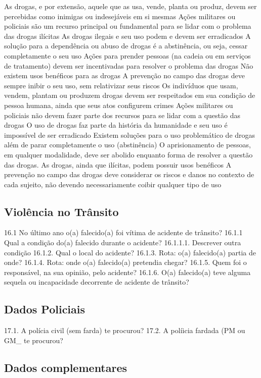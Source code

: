 As drogas, e por extensão, aquele que as usa, vende, planta ou produz, devem ser percebidas como inimigas ou indesejáveis em si mesmas
Ações militares ou policiais são um recurso principal ou fundamental para se lidar com o problema das drogas ilícitas
As drogas ilegais e seu uso podem e devem ser erradicados
A solução para a dependência ou abuso de drogas é a abstinência, ou seja, cessar completamente o seu uso
Ações para prender pessoas (na cadeia ou em serviços de tratamento) devem ser incentivadas para resolver o problema das drogas
Não existem usos benéficos para as drogas
A prevenção no campo das drogas deve sempre inibir o seu uso, sem relativizar seus riscos
Os indivíduos que usam, vendem, plantam ou produzem drogas devem ser respeitados em sua condição de pessoa humana, ainda que seus atos configurem crimes
Ações militares ou policiais não devem fazer parte dos recursos para se lidar com a questão das drogas
O uso de drogas faz parte da história da humanidade e seu uso é impossível de ser erradicado
Existem soluções para o uso problemático de drogas além de parar completamente o uso (abstinência)
O aprisionamento de pessoas, em qualquer modalidade, deve ser abolido enquanto forma de resolver a questão das drogas.
As drogas, ainda que ilícitas, podem possuir usos benéficos
A prevenção no campo das drogas deve considerar os riscos e danos no contexto de cada sujeito, não devendo necessariamente coibir qualquer tipo de uso

\subsection{Violência no Trânsito}

16.1 No último ano o(a) falecido(a) foi vítima de acidente de trânsito?
16.1.1 Qual a condição do(a) falecido durante o acidente?
16.1.1.1. Descrever outra condição
16.1.2. Qual o local do acidente?
16.1.3. Rota: o(a) falecido(a) partia de onde?
16.1.4. Rota: onde o(a) falecido(a) pretendia chegar?
16.1.5. Quem foi o responsável, na sua opinião, pelo acidente?
16.1.6. O(a) falecido(a) teve alguma sequela ou incapacidade decorrente de acidente de trânsito?

\subsection{Dados Policiais}

17.1. A polícia civil (sem farda) te procurou?
17.2. A políicia fardada (PM ou GM\_ te procurou?

\subsection{Dados complementares}

